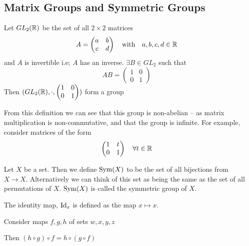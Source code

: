 \documentclass{article}
\begin{document}
\subsection{Matrix Groups and Symmetric Groups}
\begin{defi}
    Let $GL_2(\mathbb{R})$ be the set of all $2 \times 2$ matrices
    \[
        A = \begin{pmatrix}
            a & b \\
            c & d
        \end{pmatrix} \quad \text{with} \quad a,b,c,d \in \mathbb{R}
    \]
    and $A$ is invertible i.e; $A$ has an inverse. $\exists B \in GL_2$ such that
    \[
        AB = \begin{pmatrix}
            1 & 0 \\
            0 & 1
        \end{pmatrix}
    \]
    Then $(GL_2(\mathbb{R}), \cdot, \begin{pmatrix}
        1 & 0 \\
        0 & 1
    \end{pmatrix})$ form a group
\end{defi}

From this definition we can see that this group is non-abelian -- as matrix multiplication is non-commutative, and that the group is infinite. For example, consider matrices of the form
\[
    \begin{pmatrix}
        1 & t \\
        0 & 1
    \end{pmatrix} \quad \forall t \in \mathbb{R}
\]

\begin{defi}
    Let $X$ be a set. Then we define $\operatorname{Sym}(X)$ to be the set of all bijections from $X \rightarrow X$. 
    Alternatively we can think of this set as being the same as the set of all permutations of $X$.
    $\operatorname{Sym}(X)$ is called the symmetric group of $X$.
\end{defi}

\begin{defi}[$\Id_x$]
    The identity map, $\Id_x$ is defined as the map $x \mapsto x$. 
\end{defi}

\begin{lemma}
    Consider maps $f, g, h$ of sets $w, x, y, z$
    \begin{center}
    \end{center}
    Then $(h \circ g) \circ f = h \circ (g \circ f)$
\end{lemma}
\end{document}
